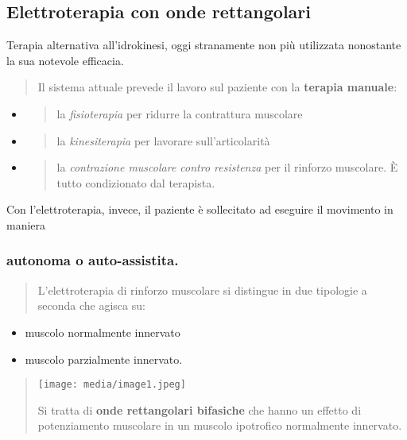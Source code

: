 \documentclass[]{article}
\begin{document}
\subsection{Elettroterapia con onde
rettangolari}\label{elettroterapia-con-onde-rettangolari}

Terapia alternativa all'idrokinesi, oggi stranamente non più utilizzata
nonostante la sua notevole efficacia.

\begin{quote}
Il sistema attuale prevede il lavoro sul paziente con la \textbf{terapia
manuale}:
\end{quote}

\begin{itemize}
\item
  \begin{quote}
  la \emph{fisioterapia} per ridurre la contrattura muscolare
  \end{quote}
\item
  \begin{quote}
  la \emph{kinesiterapia} per lavorare sull'articolarità
  \end{quote}
\item
  \begin{quote}
  la \emph{contrazione muscolare contro resistenza} per il rinforzo
  muscolare. È tutto condizionato dal terapista.
  \end{quote}
\end{itemize}

Con l'elettroterapia, invece, il paziente è sollecitato ad eseguire il
movimento in maniera

\subsubsection{autonoma o
auto-assistita.}\label{autonoma-o-auto-assistita.}

\begin{quote}
L'elettroterapia di rinforzo muscolare si distingue in due tipologie a
seconda che agisca su:
\end{quote}

\begin{itemize}
\item
  muscolo normalmente innervato
\item
  muscolo parzialmente innervato.
\end{itemize}

\begin{quote}
\texttt{[image: media/image1.jpeg]}

Si tratta di \textbf{onde rettangolari bifasiche} che hanno un effetto
di potenziamento muscolare in un muscolo ipotrofico normalmente
innervato.
\end{quote}
\end{document}
